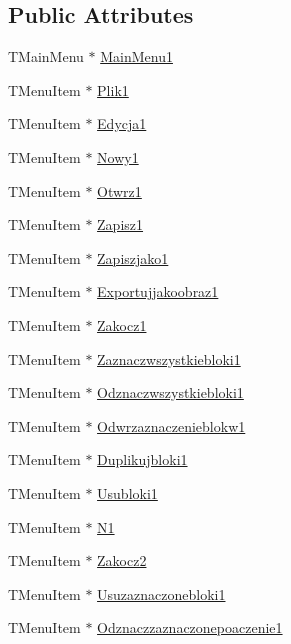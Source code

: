\subsection*{Public Attributes}
\begin{CompactItemize}
\item 
TMainMenu $\ast$ \hyperlink{classTForm1_fb129674fc9747697ab1ec4939462c70}{MainMenu1}
\item 
TMenuItem $\ast$ \hyperlink{classTForm1_bab442b2f1649d0026ddbaab2b772a94}{Plik1}
\item 
TMenuItem $\ast$ \hyperlink{classTForm1_380df144ba8d51b25de931a634bc6be2}{Edycja1}
\item 
TMenuItem $\ast$ \hyperlink{classTForm1_939bf0f4120695d5394e0cb2878683b2}{Nowy1}
\item 
TMenuItem $\ast$ \hyperlink{classTForm1_5186111e79ab009942940b48a0df9038}{Otwrz1}
\item 
TMenuItem $\ast$ \hyperlink{classTForm1_5fe7e2f7660a34d162b29f08e0542350}{Zapisz1}
\item 
TMenuItem $\ast$ \hyperlink{classTForm1_f4ce8bd1ea8a930a09853d724191f193}{Zapiszjako1}
\item 
TMenuItem $\ast$ \hyperlink{classTForm1_c8bedfca7b5dfed39edaff95ffb0577d}{Exportujjakoobraz1}
\item 
TMenuItem $\ast$ \hyperlink{classTForm1_6a033c3575a2e29c17d7c286029980f1}{Zakocz1}
\item 
TMenuItem $\ast$ \hyperlink{classTForm1_c11d4781566f19fd9dae9e3375ab1471}{Zaznaczwszystkiebloki1}
\item 
TMenuItem $\ast$ \hyperlink{classTForm1_81af1788cb8fedfe45c5ab1e9d6fa84f}{Odznaczwszystkiebloki1}
\item 
TMenuItem $\ast$ \hyperlink{classTForm1_55584a766db0eae448a1b827e95f9039}{Odwrzaznaczenieblokw1}
\item 
TMenuItem $\ast$ \hyperlink{classTForm1_fca8fb962a23fccc15b91c8770882a85}{Duplikujbloki1}
\item 
TMenuItem $\ast$ \hyperlink{classTForm1_67b6559358def61c012bd907a2994bdd}{Usubloki1}
\item 
TMenuItem $\ast$ \hyperlink{classTForm1_48a11274b861b0740194377fb412fc3c}{N1}
\item 
TMenuItem $\ast$ \hyperlink{classTForm1_b20e20b8aa20deb0db8782088a385b2f}{Zakocz2}
\item 
TMenuItem $\ast$ \hyperlink{classTForm1_655f428c436b429b7ca71c131bae8e35}{Usuzaznaczonebloki1}
\item 
TMenuItem $\ast$ \hyperlink{classTForm1_fb3981dd76bf7b054bed4b9ff9faab3f}{Odznaczzaznaczonepoaczenie1}

\end{CompactItemize}
